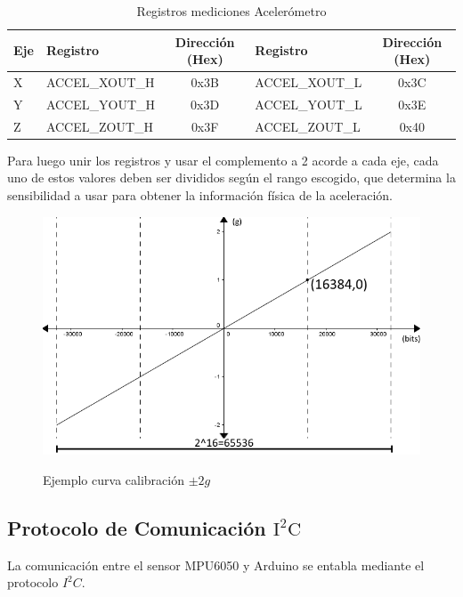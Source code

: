 \documentclass[12pt,a4paper]{article}
\begin{document}
\begin{itemize}
	\begin{table}[H]
		\centering
		\label{table:registrosaccel}
		\begin{tabular}{|l|l|c|l|c|}
			\hline
			\textbf{Eje} & \textbf{Registro} & \textbf{Dirección (Hex)} & \textbf{Registro} & \textbf{Dirección (Hex)} \\ \hline
			X            & ACCEL\_XOUT\_H     & 0x3B                     & ACCEL\_XOUT\_L     & 0x3C                     \\ \hline
			Y            & ACCEL\_YOUT\_H     & 0x3D                     & ACCEL\_YOUT\_L     & 0x3E                     \\ \hline
			Z            & ACCEL\_ZOUT\_H     & 0x3F                     & ACCEL\_ZOUT\_L     & 0x40                     \\ \hline
		\end{tabular}
		\caption{Registros mediciones Acelerómetro}					
	\end{table}				
	
	Para luego unir los registros y usar el complemento a 2 acorde a cada eje, cada uno de estos valores deben ser divididos según el rango escogido, que determina la sensibilidad a usar para obtener la información física de la aceleración.
	
	\begin{figure}[H]
		\centering
		\includegraphics[scale=0.6]{images/curvacalibracion}
		\label{fig:curvacalibracion}
		\caption{Ejemplo curva calibración $\pm 2g$}
	\end{figure}
	
\end{itemize}



\subsection{Protocolo de Comunicación $\mathbf{\mathrm{I^2C}}$}
La comunicación entre el sensor MPU6050 y Arduino se entabla mediante el protocolo $I^2C$.
\end{document}
